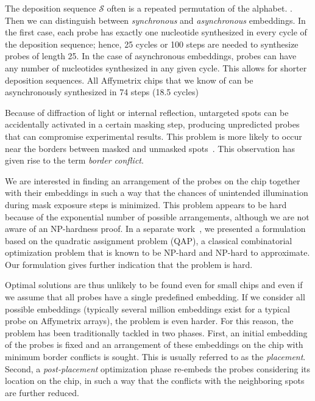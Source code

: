 \documentclass[runningheads]{llncs}
\newcommand{\ignore}[1]{}
\begin{document}
The deposition sequence $\mathcal{S}$ often is a repeated
permutation of the alphabet. \ignore{This is mainly because such sequences maximize the
number of possible subsequences \cite{CHASE76}}. Then we can
distinguish between \emph{synchronous} and \emph{asynchronous} embeddings. In
the first case, each probe has exactly one nucleotide synthesized in every
cycle of the deposition sequence; hence, 25 cycles or 100 steps are needed to
synthesize probes of length 25.
In the case of asynchronous
embeddings, probes can have any number of nucleotides synthesized in any given
cycle. This allows for shorter deposition sequences. All Affymetrix chips that
we know of can be asynchronously synthesized in 74 steps (18.5 cycles)

\ignore{We
understand that Affymetrix uses the same truncated repetition of TGCA to
synthesize most (if not all) GeneChip arrays, which suggests that their probe
selection procedure is restricted to sequences that fit into this deposition
sequence.}

Because of diffraction of light or internal reflection, untargeted spots can
be accidentally activated in a certain masking step, producing
unpredicted probes that can compromise experimental results. This problem
is more likely to occur near the borders between masked and unmasked
spots~\cite{FODOR91}. This observation has
given rise to the term \emph{border conflict}.

We are interested in finding an arrangement of the probes on the chip together
with their embeddings in such a way that the chances of unintended
illumination during mask exposure steps is minimized. This problem appears to
be hard because of the exponential number of possible arrangements,
although we are not aware of an NP-hardness proof.
In a separate work~\cite{CARVALHO06}, we presented a formulation based on
the quadratic assignment problem (QAP), a classical combinatorial optimization
problem that is known to be NP-hard and NP-hard to approximate. Our formulation
gives further indication that the problem is hard.

Optimal solutions are thus
unlikely to be found even for small chips and even if we assume that all probes
have a single predefined embedding.
If we consider all possible embeddings (typically several million embeddings exist for a typical probe on Affymetrix arrays), the problem is even
harder. For this reason, the problem has been traditionally tackled in two
phases. First, an initial embedding of the probes is fixed and an arrangement of
these embeddings on the chip with minimum border conflicts is sought. This is
usually referred to as the \emph{placement}. Second, a \emph{post-placement}
optimization phase re-embeds the probes considering its location on the chip,
in such a way that the conflicts with the neighboring spots are further reduced.
\end{document}
